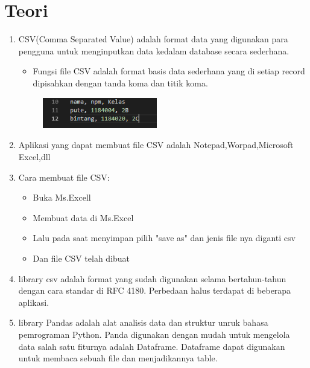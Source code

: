 \chapter*{Teori}

\begin{enumerate}
	\item CSV(Comma Separated Value) adalah format data yang digunakan para pengguna untuk menginputkan data kedalam database secara sederhana.

	\begin{itemize}
	\item Fungsi file CSV adalah format basis data sederhana yang di setiap record dipisahkan dengan tanda koma dan titik koma.
	\end{itemize}
	
	\begin{figure} [h]
	\includegraphics[width=5cm]{poto/1.png}
	\centering
	\end{figure}		
	
	
	
	
	\item Aplikasi yang dapat membuat file CSV adalah Notepad,Worpad,Microsoft Excel,dll
	
	\item Cara membuat file CSV:
	\begin{itemize}
	\item Buka Ms.Excell
	\end{itemize}
	\begin{itemize}
	\item Membuat data di Ms.Excel
	\end{itemize}
	\begin{itemize}
	\item Lalu pada saat menyimpan pilih "save as" dan jenis file nya diganti csv
	\end{itemize}
	\begin{itemize}
	\item Dan file CSV telah dibuat
	\end{itemize}

	\item library csv adalah format yang sudah digunakan selama bertahun-tahun dengan cara standar di RFC 4180. Perbedaan halus terdapat di beberapa aplikasi.
	
	
	\item library Pandas adalah alat analisis data dan struktur unruk bahasa pemrograman Python.  Panda digunakan dengan mudah untuk mengelola data salah satu fiturnya adalah Dataframe. Dataframe dapat digunakan untuk membaca sebuah file dan menjadikannya table.



\end{enumerate}
